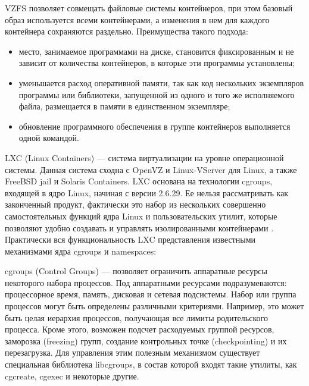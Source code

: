 VZFS позволяет совмещать файловые системы контейнеров, при этом базовый образ используется всеми контейнерами, а изменения в нем для каждого контейнера сохраняются раздельно.
Преимущества такого подхода:
\begin{itemize}
  \item место, занимаемое программами на диске, становится фиксированным и не зависит от количества контейнеров, в которые эти программы установлены;
  \item уменьшается расход оперативной памяти, так как код нескольких экземпляров программы или библиотеки, запущенной из одного и того же исполняемого файла, размещается в памяти в единственном экземпляре;
  \item обновление программного обеспечения в группе контейнеров выполняется одной командой.
\end{itemize}

LXC (Linux Containers) --- система виртуализации на уровне операционной системы.
Данная система сходна с OpenVZ и Linux-VServer для Linux, а также FreeBSD jail и Solaris Containers.
LXC основана на технологии cgroups, входящей в ядро Linux, начиная с версии 2.6.29.
Ее нельзя рассматривать как законченный продукт, фактически это набор из нескольких совершенно самостоятельных функций ядра Linux и пользовательских утилит, которые позволяют удобно создавать и управлять изолированными контейнерами \cite{lxc}.
Практически вся функциональность LXC представления известными механизмами ядра cgroups и namespaces:

cgroups (Control Groups) --- позволяет ограничить аппаратные ресурсы некоторого набора процессов.
Под аппаратными ресурсами подразумеваются: процессорное время, память, дисковая и сетевая подсистемы.
Набор или группа процессов могут быть определены различными критериями.
Например, это может быть целая иерархия процессов, получающая все лимиты родительского процесса.
Кроме этого, возможен подсчет расходуемых группой ресурсов, заморозка (freezing) групп, создание контрольных точке (checkpointing) и их перезагрузка.
Для управления этим полезным механизмом существует специальная библиотека libcgroups, в состав которой входят такие утилиты, как cgcreate, cgexec и некоторые другие.

